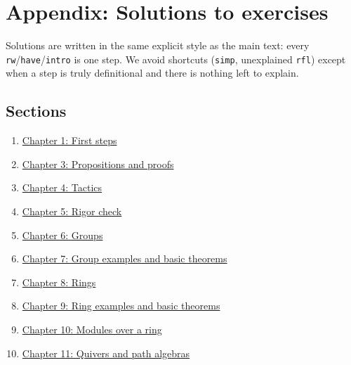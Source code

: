 \chapter*{Appendix: Solutions to exercises}
\setcounter{section}{0}\label{sec:14-appendix-solutions:00-index:1}

Solutions are written in the same explicit style as the main text: every \texttt{rw}/\texttt{have}/\texttt{intro} is one step. We avoid shortcuts (\texttt{simp}, unexplained \texttt{rfl}) except when a step is truly definitional and there is nothing left to explain.

\section*{Sections}
\label{sec:14-appendix-solutions:00-index:2}

\begin{enumerate}
\def\labelenumi{\arabic{enumi}.}
\tightlist
\item
  \hyperref[sec:14-appendix-solutions:01-chapter-1:1]{Chapter 1: First steps}
\item
  \hyperref[sec:14-appendix-solutions:02-chapter-3:1]{Chapter 3: Propositions and proofs}
\item
  \hyperref[sec:14-appendix-solutions:03-chapter-4:1]{Chapter 4: Tactics}
\item
  \hyperref[sec:14-appendix-solutions:04-chapter-5:1]{Chapter 5: Rigor check}
\item
  \hyperref[sec:14-appendix-solutions:05-chapter-6:1]{Chapter 6: Groups}
\item
  \hyperref[sec:14-appendix-solutions:06-chapter-7:1]{Chapter 7: Group examples and basic theorems}
\item
  \hyperref[sec:14-appendix-solutions:07-chapter-8:1]{Chapter 8: Rings}
\item
  \hyperref[sec:14-appendix-solutions:08-chapter-9:1]{Chapter 9: Ring examples and basic theorems}
\item
  \hyperref[sec:14-appendix-solutions:09-chapter-10:1]{Chapter 10: Modules over a ring}
\item
  \hyperref[sec:14-appendix-solutions:10-chapter-11:1]{Chapter 11: Quivers and path algebras}
\end{enumerate}











